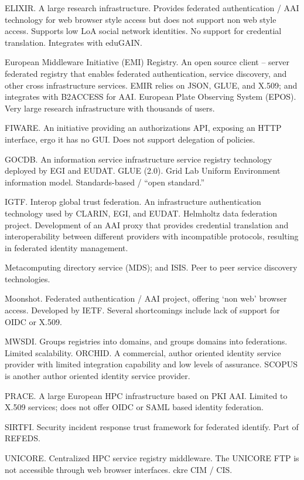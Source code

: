 ELIXIR. A large research infrastructure. Provides federated
authentication / AAI technology for web browser style access but does
not support non web style access. Supports low LoA social network
identities. No support for credential translation. Integrates with
eduGAIN.

European Middleware Initiative (EMI) Registry. An open source client –
server federated registry that enables federated authentication,
service discovery, and other cross infrastructure services. EMIR
relies on JSON, GLUE, and X.509; and integrates with B2ACCESS for
AAI. European Plate Observing System (EPOS). Very large research
infrastructure with thousands of users.

FIWARE. An initiative providing an authorizations API, exposing an
HTTP interface, ergo it has no GUI. Does not support delegation of
policies.

GOCDB. An information service infrastructure service registry
technology deployed by EGI and EUDAT.  GLUE (2.0). Grid Lab Uniform
Environment information model. Standards-based / “open standard.”

IGTF. Interop global trust federation. An infrastructure
authentication technology used by CLARIN, EGI, and EUDAT.  Helmholtz
data federation project. Development of an AAI proxy that provides
credential translation and interoperability between different
providers with incompatible protocols, resulting in federated identity
management.

Metacomputing directory service (MDS); and ISIS. Peer to peer service
discovery technologies.

Moonshot. Federated authentication / AAI project, offering ‘non web’
browser access. Developed by IETF. Several shortcomings include lack
of support for OIDC or X.509.

MWSDI. Groups registries into domains, and groups domains into
federations. Limited scalability.  ORCHID. A commercial, author
oriented identity service provider with limited integration capability
and low levels of assurance. SCOPUS is another author oriented
identity service provider.

PRACE. A large European HPC infrastructure based on PKI AAI. Limited
to X.509 services; does not offer OIDC or SAML based identity
federation.

SIRTFI. Security incident response trust framework for federated
identify. Part of REFEDS.

UNICORE. Centralized HPC service registry middleware. The UNICORE FTP
is not accessible through web browser interfaces. ckre CIM / CIS.

